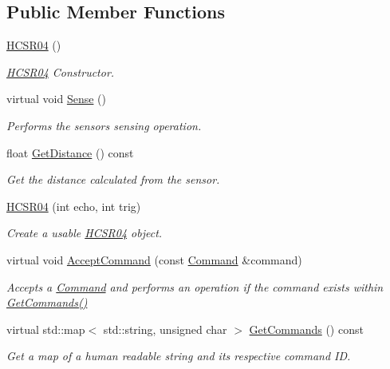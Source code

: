 \subsection*{Public Member Functions}
\begin{DoxyCompactItemize}
\item 
\hyperlink{classrbp_1_1HCSR04_aedc0e7fb482ff9c231693199acdef08a}{H\+C\+S\+R04} ()
\begin{DoxyCompactList}\small\item\em \hyperlink{classrbp_1_1HCSR04}{H\+C\+S\+R04} Constructor. \end{DoxyCompactList}\item 
virtual void \hyperlink{classrbp_1_1HCSR04_a8f8cc45655cacfb94ade5078c40ab1ba}{Sense} ()
\begin{DoxyCompactList}\small\item\em Performs the sensor\textquotesingle{}s sensing operation. \end{DoxyCompactList}\item 
float \hyperlink{classrbp_1_1HCSR04_aab17c63c05ffe5f351acc0112d6275cf}{Get\+Distance} () const 
\begin{DoxyCompactList}\small\item\em Get the distance calculated from the sensor. \end{DoxyCompactList}\item 
\hyperlink{classrbp_1_1HCSR04_a38f9bdcdff148fa58ee1c50661d9349f}{H\+C\+S\+R04} (int echo, int trig)
\begin{DoxyCompactList}\small\item\em Create a usable \hyperlink{classrbp_1_1HCSR04}{H\+C\+S\+R04} object. \end{DoxyCompactList}\item 
virtual void \hyperlink{classrbp_1_1HCSR04_a5f7030ea092c72991fab902e1a2384f5}{Accept\+Command} (const \hyperlink{classrbp_1_1Command}{Command} \&command)
\begin{DoxyCompactList}\small\item\em Accepts a \hyperlink{classrbp_1_1Command}{Command} and performs an operation if the command exists within \hyperlink{classrbp_1_1HCSR04_ab418091c846e7256c6d937eb4cea60d0}{Get\+Commands()} \end{DoxyCompactList}\item 
virtual std\+::map$<$ std\+::string, unsigned char $>$ \hyperlink{classrbp_1_1HCSR04_ab418091c846e7256c6d937eb4cea60d0}{Get\+Commands} () const 
\begin{DoxyCompactList}\small\item\em Get a map of a human readable string and its respective command I\+D. \end{DoxyCompactList}\item 

\end{DoxyCompactItemize}

